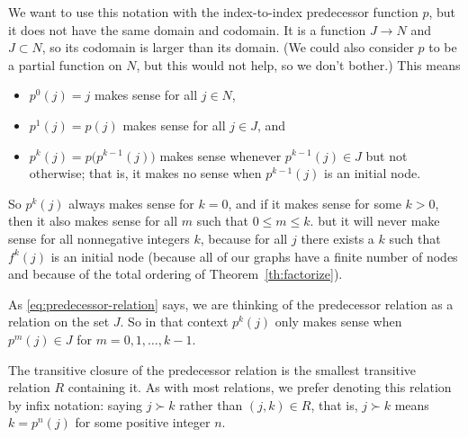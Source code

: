 We want to use this notation with the index-to-index predecessor function
$p$, but it does not have the same domain and codomain.  It is a function
$J \to N$ and $J \subset N$, so its codomain is larger than its domain.
(We could also consider $p$ to be a partial function on $N$, but this would
not help, so we don't bother.)  This means
\begin{itemize}
\item $p^0(j) = j$ makes sense for all $j \in N$,
\item $p^1(j) = p(j)$ makes sense for all $j \in J$, and
\item $p^k(j) = p\bigl(p^{k - 1}(j)\bigr)$ makes sense whenever
    $p^{k - 1}(j) \in J$ but not otherwise; that is, it makes no sense when
    $p^{k - 1}(j)$ is an initial node.
\end{itemize}
So $p^k(j)$ always makes sense for $k = 0$, and if it makes sense for
some $k > 0$, then it also makes sense for all $m$ such that $0 \le m \le k$.
but it will never make sense for all nonnegative integers $k$, because
for all $j$ there exists a $k$ such that $f^k(j)$ is an initial node
(because all of our graphs have a finite number of nodes
and because of the total ordering of Theorem~\ref{th:factorize}).

As \eqref{eq:predecessor-relation} says,
we are thinking of the predecessor relation as a relation on the set $J$.
So in that context $p^k(j)$ only makes sense when $p^m(j) \in J$
for $m = 0, 1, \ldots, k - 1$.

The transitive closure of the predecessor relation
is the smallest transitive relation $R$ containing it.
As with most relations, we prefer denoting this relation by infix notation:
saying $j \succ k$ rather than $(j, k) \in R$, that is, $j \succ k$ means
$k = p^n(j)$ for some positive integer $n$.

